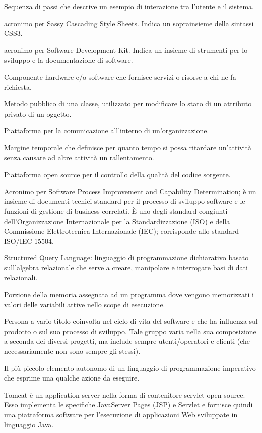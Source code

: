 \item[scenario] Sequenza di passi che descrive un esempio di interazione tra l'utente e il sistema.
\item[SCSS] acronimo per Sassy Cascading Style Sheets. Indica un soprainsieme della sintassi CSS3.
\item[SDK] acronimo per Software Development Kit. Indica un insieme di strumenti per lo sviluppo e la documentazione di software.
\item[server] Componente hardware e/o software che fornisce servizi o risorse a chi ne fa richiesta.
\item[setter] Metodo pubblico di una classe, utilizzato per modificare lo stato di un attributo privato di un oggetto.
\item[Slack] Piattaforma per la comunicazione all'interno di un'organizzazione.
\item[ periodo di slack] Margine temporale che definisce per quanto tempo si possa ritardare un’attività senza causare ad altre attività un rallentamento.
\item[SonarQube] Piattaforma open source per il controllo della qualità del codice sorgente.
\item[SPICE] Acronimo per Software Process Improvement and Capability Determination; è un insieme di documenti tecnici standard per il processo di sviluppo software e le funzioni di gestione di business correlati. È uno degli standard congiunti dell’Organizzazione Internazionale per la Standardizzazione (ISO) e della Commissione Elettrotecnica Internazionale (IEC); corrisponde allo standard ISO/IEC 15504.
\item[SQL] Structured Query Language: linguaggio di programmazione dichiarativo basato sull'algebra relazionale che serve a creare, manipolare e interrogare basi di dati relazionali.
\item[stack] Porzione della memoria assegnata ad un programma dove vengono memorizzati i valori delle variabili attive nello scope di esecuzione.
\item[stakeholder] Persona a vario titolo coinvolta nel ciclo di vita del software e che ha influenza sul prodotto o sul suo processo di sviluppo. Tale gruppo varia nella sua composizione a seconda dei diversi progetti, ma include sempre utenti/operatori e clienti (che necessariamente non sono sempre gli stessi).
\item[statement] Il più piccolo elemento autonomo di un linguaggio di programmazione imperativo che esprime una qualche azione da eseguire.
\item[Tomcat] Tomcat è un application server nella forma di contenitore servlet open-source. Esso implementa le specifiche JavaServer Pages (JSP) e Servlet e fornisce quindi una piattaforma software per l'esecuzione di applicazioni Web sviluppate in linguaggio Java.
